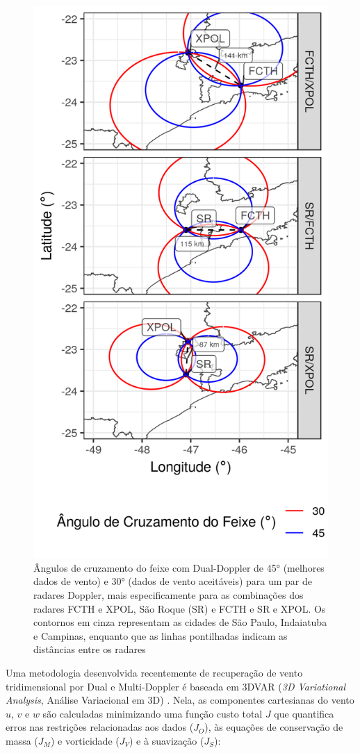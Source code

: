 \begin{figure}[hp]
	\begin{center}
		\caption{Ângulos de cruzamento do feixe com Dual-Doppler de \ang{45} (melhores dados de vento) e \ang{30} (dados de vento aceitáveis) para um par de radares Doppler, mais especificamente para as combinações dos radares FCTH e XPOL, São Roque (SR) e FCTH e SR e XPOL. Os contornos em cinza representam as cidades de São Paulo, Indaiatuba e Campinas, enquanto que as linhas pontilhadas indicam as distâncias entre os radares} 
		\label{doppler_lobes}
		\includegraphics[width=0.65\columnwidth]{../General_Processing/figures/dual_doppler_lobes_ptbr.png}
	\end{center}
\end{figure}

Uma metodologia desenvolvida recentemente de recuperação de vento tridimensional por Dual e Multi-Doppler é baseada em 3DVAR (\textit{3D Variational Analysis}, Análise Variacional em 3D) \cite{Shapiro2009, Potvin2012b}. Nela, as componentes cartesianas do vento $u$, $v$ e $w$ são calculadas minimizando uma função custo total $J$ que quantifica erros nas restrições relacionadas aos dados ($J_O$), às equações de conservação de massa ($J_M$) e vorticidade ($J_V$) e à suavização ($J_S$):

